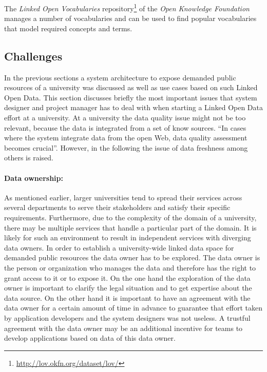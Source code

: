 \documentclass{article}
\begin{document}
The \textit{Linked Open Vocabularies} repository\footnote{\url{http://lov.okfn.org/dataset/lov/}} of the \textit{Open Knowledge Foundation} manages a number of vocabularies and can be used to find popular vocabularies that model required concepts and terms.

\subsection{Challenges}
\label{technical-architecture-challenges:challenges}
In the previous sections a system architecture to expose demanded public resources of a university was discussed as well as use cases based on such Linked Open Data. This section discusses briefly the most important issues that system designer and project manager has to deal with when starting a Linked Open Data effort at a university. At a university the data quality issue might not be too relevant, because the data is integrated from a set of know sources. \enquote{In cases where the system integrate data from the open Web, data quality assessment becomes crucial}\cite{heath_linked_2011}. However, in the following the issue of data freshness among others is raised.

\paragraph{Data ownership:}
\label{technical-architecture-challenges:challenges:data-ownership}
As mentioned earlier, larger universities tend to spread their services across several departments to serve their stakeholders and satisfy their specific requirements. Furthermore, due to the complexity of the domain of a university, there may be multiple services that handle a particular part of the domain. It is likely for such an environment to result in independent services with diverging data owners. In order to establish a university-wide linked data space for demanded public resources the data owner has to be explored. The data owner is the person or organization who manages the data and therefore has the right to grant access to it or to expose it. On the one hand the exploration of the data owner is important to clarify the legal situation and to get expertise about the data source. On the other hand it is important to have an agreement with the data owner for a certain amount of time in advance to guarantee that effort taken by application developers and the system designers was not useless. A trustful agreement with the data owner may be an  additional incentive for teams to develop applications based on data of this data owner.
\end{document}
